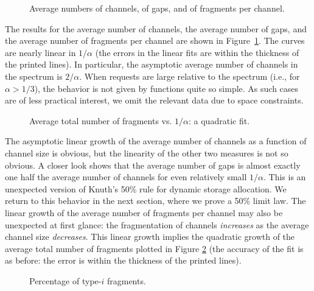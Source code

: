 \documentclass{amsart}
\begin{document}
\begin{figure}[!t]
\begin{center}
 \caption{Average numbers of channels, of gaps, and of fragments per
 channel.}
 \label{fig-linear-frag}
\end{center}
\end{figure}

The results for
the average number of channels, the average number of gaps, and the
average number of fragments per channel are shown in Figure~\ref{fig-linear-frag}. The curves are nearly linear in $1/\alpha$ (the errors in the linear fits are within the thickness of the printed
lines). In particular, the asymptotic
average number of channels in the spectrum is $2/\alpha$. When requests are large relative to the spectrum
(i.e., for $\alpha >1/3$), the behavior is not given by functions
quite so simple. As such cases are of less practical
interest, we omit the relevant data due to space
constraints.

\begin{figure}[t]
\begin{center}
 \caption{Average total number of fragments vs. $1/\alpha$: a quadratic fit.}
 \label{fig-quad-frag}
\end{center}
\end{figure}
The asymptotic linear growth of the average number of channels as a
function of channel size is obvious, but the linearity of the other
two measures is not so obvious.  A closer look shows that the
average number of gaps is almost exactly one half the average number
of channels for even relatively small $1/\alpha$. This is an
unexpected version of Knuth's 50\% rule for dynamic storage
allocation.  We return to this behavior in the next section, where
we prove a 50\% limit law.
The linear growth of the average number of fragments
per channel may also be unexpected at
first glance:  the fragmentation of channels  {\it increases}
as the  average channel size
{\it decreases}.   This linear growth  implies the
quadratic  growth of the  average total
number of fragments plotted in Figure \ref{fig-quad-frag}
(the accuracy of the fit is as
before: the  error is within the  thickness of the  printed lines).


\begin{figure}[!t]
\begin{center}
 \caption{Percentage of type-$i$ fragments.}
 \label{fig:frag-type}
\end{center}
\end{figure}
\end{document}
